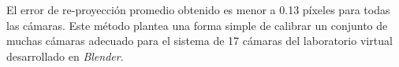  El error de re-proyección promedio obtenido es menor a 0.13 píxeles para todas las cámaras. Este método plantea una forma simple de calibrar un conjunto de muchas cámaras adecuado para el sistema de 17 cámaras del laboratorio virtual desarrollado en \emph{Blender}.


  
  
  



